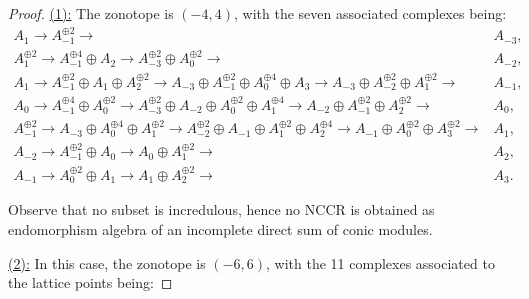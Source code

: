 \documentclass[reqno, 12pt]{amsart}
\theoremstyle{definition}
\numberwithin{equation}{section}
\begin{document}
\begin{proof}
    \underline{(1):} The zonotope is $(-4,4)$, with the seven associated complexes being:
    \begin{align*}
        A_1\longrightarrow A_{-1}^{\oplus 2}\longrightarrow & A_{-3},\\
        A_1^{\oplus 2}\longrightarrow A_{-1}^{\oplus 4}\oplus A_2\longrightarrow A_{-3}^{\oplus 2}\oplus A_0^{\oplus 2}\longrightarrow & A_{-2},\\
        A_1 \longrightarrow A_{-1}^{\oplus 2}\oplus A_1\oplus A_2^{\oplus 2}\longrightarrow A_{-3}\oplus A_{-1}^{\oplus 2}\oplus A_0^{\oplus 4}\oplus A_3\longrightarrow A_{-3}\oplus A_{-2}^{\oplus 2}\oplus A_1^{\oplus 2}\longrightarrow & A_{-1},\\
        A_0\longrightarrow A_{-1}^{\oplus 4}\oplus A_0^{\oplus 2}\longrightarrow A_{-3}^{\oplus 2}\oplus A_{-2}\oplus A_0^{\oplus 2}\oplus A_1^{\oplus 4}\longrightarrow A_{-2}\oplus A_{-1}^{\oplus 2}\oplus A_{2}^{\oplus 2}\longrightarrow & A_0,\\
        A_{-1}^{\oplus 2}\longrightarrow A_{-3}\oplus A_0^{\oplus 4}\oplus A_1^{\oplus 2}\longrightarrow A_{-2}^{\oplus 2}\oplus A_{-1}\oplus A_1^{\oplus 2}\oplus A_2^{\oplus 4}\longrightarrow A_{-1}\oplus A_0^{\oplus 2}\oplus A_3^{\oplus 2}\longrightarrow & A_1,\\
        A_{-2}\longrightarrow A_{-1}^{\oplus 2}\oplus A_0\longrightarrow A_0\oplus A_1^{\oplus 2}\longrightarrow & A_2,\\
        A_{-1}\longrightarrow A_0^{\oplus 2}\oplus A_1\longrightarrow A_1\oplus A_2^{\oplus 2}\longrightarrow &  A_3.
    \end{align*}


    Observe that no subset is incredulous, hence no NCCR is obtained as endomorphism algebra of an incomplete direct sum of conic modules. 

    \underline{(2):} In this case, the zonotope is $(-6,6)$, with the 11 complexes associated to the lattice points being:


\end{proof}
\end{document}
